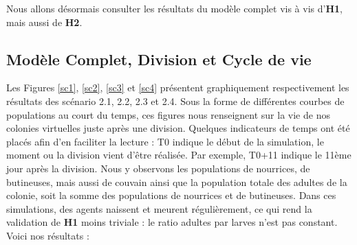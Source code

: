 	Nous allons désormais consulter les résultats du modèle complet vis à vis d'\textbf{H1}, mais aussi de \textbf{H2}.
	
	\subsection{Modèle Complet, Division et Cycle de vie}
	
	
	Les Figures \ref{sc1}, \ref{sc2}, \ref{sc3} et \ref{sc4} présentent graphiquement respectivement les résultats des scénario 2.1, 2.2, 2.3 et 2.4. Sous la forme de différentes courbes de populations au court du temps, ces figures nous renseignent sur la vie de nos colonies virtuelles juste après une division. Quelques indicateurs de temps ont été placés afin d'en faciliter la lecture : T0 indique le début de la simulation, le moment ou la division vient d'être réalisée. Par exemple, T0+11 indique le 11ème jour après la division. Nous y observons les populations de nourrices, de butineuses, mais aussi de couvain ainsi que la population totale des adultes de la colonie, soit la somme des populations de nourrices et de butineuses. Dans ces simulations, des agents naissent et meurent régulièrement, ce qui rend la validation de \textbf{H1} moins triviale : le ratio adultes par larves n'est pas constant. Voici nos résultats :
		
